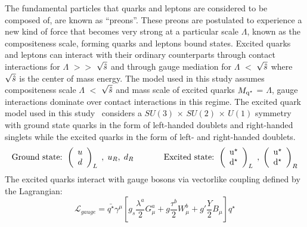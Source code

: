 The fundamental particles that quarks and leptons are considered to be composed of, are known as ``preons''. These preons are postulated to experience a new kind of
force that becomes very strong at a particular scale $\Lambda$, known as the compositeness scale, forming quarks and leptons bound states. 
Excited quarks and leptons can interact with their ordinary counterparts through contact interactions for $\Lambda$ $>>$ $\sqrt{\hat{s}}$ and through gauge
mediation for $\Lambda$ $<$ $\sqrt{\hat{s}}$ where $\sqrt{\hat{s}}$ is the center of mass energy. The model used in this study assumes compositeness scale $\Lambda$
$<$ $\sqrt{\hat{s}}$ and mass scale of excited quarks $M_{\mathrm{q^\star}}$ = $\Lambda$, gauge interactions dominate over contact interactions in this regime.
The excited quark model used in this study~\cite{Baur:1989kv} considers a $SU(3)$ $\times$ $SU(2)$ $\times$ $U(1)$ symmetry with ground state quarks in the
form of left-handed doublets and right-handed singlets while the excited quarks in the form of left- and right-handed doublets. 
\begin{equation}
\textrm{Ground state: }\left(\begin{array}{c} u \\ d \\ \end{array} \right)_{L}
\hspace{0.1cm}, \hspace{0.1cm} u_{R}, \hspace{0.1cm} d_{R} \hspace{0.5in}
\textrm{Excited state: }\left(\begin{array}{c} \mathrm{u^\star} \\ \mathrm{d^\star} \\ \end{array} \right)_{L}
\hspace{0.1cm}, \hspace{0.1cm} \left(\begin{array}{c} \mathrm{u^\star} \\ \mathrm{d^\star} \\ \end{array} \right)_{R}
\end{equation}
The excited quarks interact with gauge bosons via vectorlike coupling defined by the Lagrangian:
\begin{equation}
\mathcal{L}_{gauge} = \bar{q^{\star}}\gamma^{\mu} \left[ g_{s}\frac{\lambda^{a}}{2}G_{\mu}^{a} + g\frac{\tau^{b}}{2}W_{\mu}^{b} + g'\frac{Y}{2}B_{\mu} \right]q^{\star}
\end{equation}
